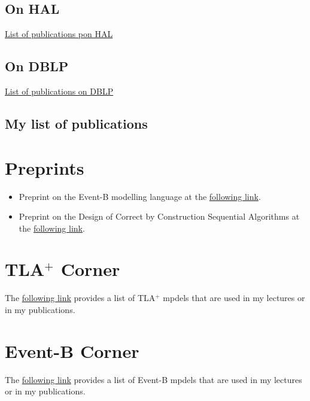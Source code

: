 \documentclass[ 12pt]{article}
\begin{document}
\subsection{On HAL}


 \href{https://haltools.inria.fr/Public/afficheRequetePubli.php?auteur_exp=dominique%2Cmery&annee_publideb=1980&annee_publifin=2026&CB_auteur=oui&CB_titre=oui&CB_article=oui&langue=Anglais&tri_exp=annee_publi&tri_exp2=typdoc&tri_exp3=date_publi&ordre_aff=TA&Fen=Aff&css=../css/VisuRubriqueEncadre.css}{List
   of publications pon HAL}

\subsection{On DBLP }
  \href{https://dblp.org/pid/51/6932.html}{List
   of publications on  DBLP }

 

 \subsection{My list of publications}
%
%




\section{Preprints}
\label{sec:documents}

\begin{itemize}

\item Preprint on the Event-B modelling language  at the 
  \href{http://mery54.github.io/mery/publications/preprint-chaptereventb.pdf}{following     link}. 

  \item Preprint on the Design of Correct by Construction Sequential
   Algorithms  at the 
  \href{http://mery54.github.io/mery/publications/preprint-chapterseqalgo.pdf}{following     link}. 

\end{itemize}

\section{TLA$^+$ Corner}
\label{sec:tla+-corner}

 The  \href{http://mery54.github.io/mery/tla/}{following
   link} provides a list of TLA$^+$ mpdels that are  used in my
 lectures or in my publications. 


\section{Event-B Corner}
\label{sec:tla+-corner}

 The  \href{http://mery54.github.io/mery/eventb/}{following
   link} provides a list of  Event-B mpdels that are  used in my
 lectures or in my publications. 
\end{document}
